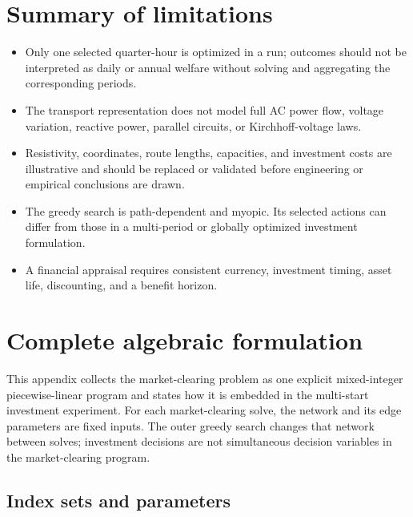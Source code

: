 \documentclass[11pt]{article}
\begin{document}
\section{Summary of limitations}

\begin{itemize}[leftmargin=*]
\item Only one selected quarter-hour is optimized in a run; outcomes should not
      be interpreted as daily or annual welfare without solving and aggregating
      the corresponding periods.
\item The transport representation does not model full AC power flow, voltage
      variation, reactive power, parallel circuits, or Kirchhoff-voltage laws.
\item Resistivity, coordinates, route lengths, capacities, and investment costs
      are illustrative and should be replaced or validated before engineering or
      empirical conclusions are drawn.
\item The greedy search is path-dependent and myopic. Its selected actions can
      differ from those in a multi-period or globally optimized investment
      formulation.
\item A financial appraisal requires consistent currency, investment timing,
      asset life, discounting, and a benefit horizon.
\end{itemize}

\appendix
\section{Complete algebraic formulation}

This appendix collects the market-clearing problem as one explicit
mixed-integer piecewise-linear program and states how it is embedded in the
multi-start investment experiment. For each market-clearing solve, the network
and its edge parameters are fixed inputs. The outer greedy search changes that
network between solves; investment decisions are not simultaneous decision
variables in the market-clearing program.

\subsection{Index sets and parameters}
\end{document}

